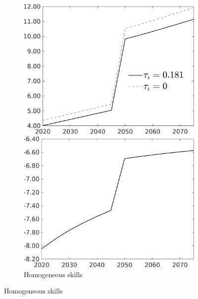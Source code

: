 \begin{figure}[h!!]
	\begin{subfigure}{0.9\textwidth}
		\caption{Homogeneous skills}
		\begin{minipage}[]{0.45\textwidth}
			\includegraphics[width=1\textwidth]{../../codding_model/own_basedOnFried/optimalPol_010922_revision/figures/all_13Sept22/CompTauf_bytaul_Reg0_tauf_spillover0_nsk1_xgr0_knspil0_sep0_LFlimit1_emsbase0_countec0_GovRev0_etaa0.79_lgd1.png}
		\end{minipage}	
		\begin{minipage}[]{0.45\textwidth}
			\includegraphics[width=1\textwidth]{../../codding_model/own_basedOnFried/optimalPol_010922_revision/figures/all_13Sept22/CompTaufPER_bytaul_Reg0_tauf_spillover0_nsk1_xgr0_knspil0_sep0_LFlimit1_emsbase0_countec0_GovRev0_etaa0.79_lgd0.png} 
		\end{minipage}	
	\end{subfigure}		
	

\end{figure}
